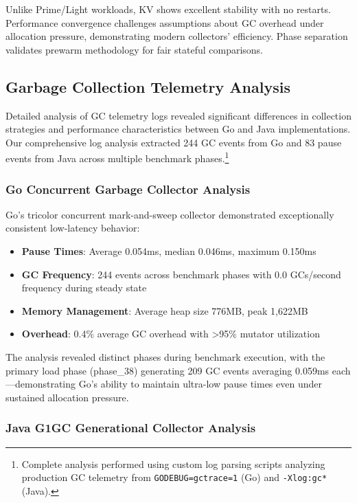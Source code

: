 \documentclass{article}
\begin{document}
Unlike Prime/Light workloads, KV shows excellent stability with no restarts. Performance convergence challenges assumptions about GC overhead under allocation pressure, demonstrating modern collectors' efficiency. Phase separation validates prewarm methodology for fair stateful comparisons.

\subsection{Garbage Collection Telemetry Analysis}

Detailed analysis of GC telemetry logs revealed significant differences in collection strategies and performance characteristics between Go and Java implementations. Our comprehensive log analysis extracted 244 GC events from Go and 83 pause events from Java across multiple benchmark phases.\footnote{Complete analysis performed using custom log parsing scripts analyzing production GC telemetry from \texttt{GODEBUG=gctrace=1} (Go) and \texttt{-Xlog:gc*} (Java).}

\subsubsection{Go Concurrent Garbage Collector Analysis}

Go's tricolor concurrent mark-and-sweep collector demonstrated exceptionally consistent low-latency behavior:

\begin{itemize}
    \item \textbf{Pause Times}: Average 0.054ms, median 0.046ms, maximum 0.150ms
    \item \textbf{GC Frequency}: 244 events across benchmark phases with 0.0 GCs/second frequency during steady state
    \item \textbf{Memory Management}: Average heap size 776MB, peak 1,622MB
    \item \textbf{Overhead}: 0.4\% average GC overhead with >95\% mutator utilization
\end{itemize}

The analysis revealed distinct phases during benchmark execution, with the primary load phase (phase\_38) generating 209 GC events averaging 0.059ms each—demonstrating Go's ability to maintain ultra-low pause times even under sustained allocation pressure.

\subsubsection{Java G1GC Generational Collector Analysis}
\end{document}
